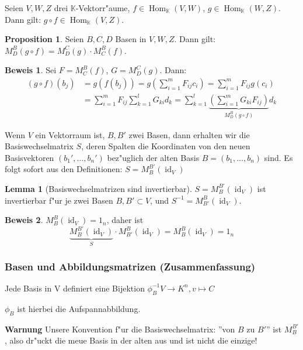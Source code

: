 \documentclass[11pt]{article}
\DeclareMathOperator{\mHom}{Hom}
\DeclareMathOperator{\mId}{id}
\theoremstyle{remark}
\theoremstyle{definition}
\newtheorem{prof}{Beweis}
\newtheorem*{proposition}{Proposition}
\newtheorem*{lemma}{Lemma}
\theoremstyle{remark}
\begin{document}
Seien \(V, W, Z\) drei \(\mathbb{K}\)-Vektorr"aume, \(f \in \mHom_\mathbb{K}(V, W)\), \(g \in \mHom_\mathbb{K}(W,Z)\). Dann gilt: \(g\circ f \in \mHom_\mathbb{K}(V,Z)\).

\begin{proposition}
	 Seien \(B,C,D\) Basen in
	\(V,W,Z\). Dann gilt: \(M^B_D(g\circ f) = M^C_D(g)\cdot M^B_C(f)\).
\end{proposition}
\begin{prof}
 Sei \(F = M^B_C(f)\), \(G = M^C_D(g)\). Dann:
 \begin{align*}
 (g\circ f)(b_j) &= g(f(b_j)) = g\left(\sum_{i=1}^m F_{ij}c_i\right) = \sum_{i=1}^mF_{ij}g(c_i) \\&= \sum_{i=1}^m F_{ij}\sum_{k=1}^lG_{ki}d_k = \sum_{k=1}^l\underbrace{\left(\sum_{i=1}^mG_{ki}F_{ij}\right)}_{M^B_D(g\circ f)}d_k
 \end{align*}
\end{prof}

Wenn \(V\) ein Vektorraum ist, \(B,B'\) zwei Basen, dann erhalten wir die
 Basiswechselmatrix \(S\), deren Spalten die Koordinaten von den neuen
 Basisvektoren \((b_1', \dots, b_n')\) bez"uglich der alten Basis \(B = (b_1,
 \dots, b_n)\) sind. Es folgt sofort aus den Definitionen:
 \(S=M^{B'}_B(\mId_V)\)
 
\begin{lemma}[Basiswechselmatrizen sind invertierbar]
	\(S = M^{B'}_B(\mId_V)\) ist invertierbar f"ur je zwei Basen \(B, B' \subset V\), und \(S^{-1} = M^B_{B'}(\mId_V)\).
\end{lemma}
\begin{prof}
	\(M^B_B(\mId_V)=1_n\), daher ist
	\[\underbrace{M^{B'}_B(\mId_V)}_{S}\cdot M^B_{B'}(\mId_V) = M^B_B(\mId_V) = 1_n \]
\end{prof}


\subsubsection{Basen und Abbildungsmatrizen (Zusammenfassung)}
\label{sec:baab}
Jede Basis in V definiert eine Bijektion $\phi_B^{-1}V\rightarrow K^n, v\mapsto C$
\begin{relation}
  $\phi_B$ ist hierbei die Aufspannabbildung.  
\end{relation}

\textbf{Warnung} Unsere Konvention f"ur die Basiswechselmatrix: ''von $B$ zu
$B'$'' ist $M^{B'}_B$, also dr"uckt die meue Basis in der alten aus und ist
nicht die einzige!
\end{document}
